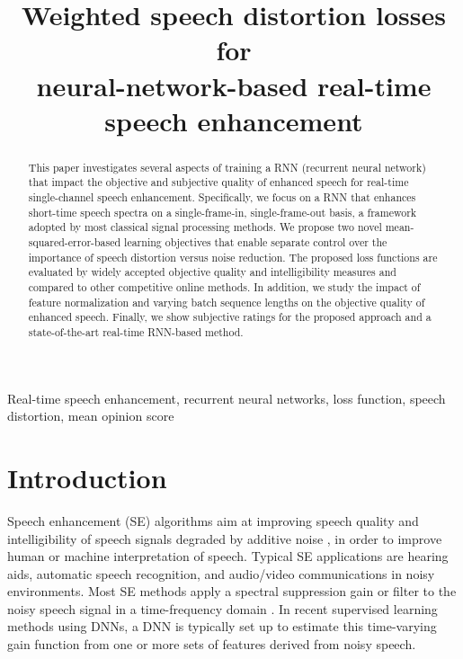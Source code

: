 \documentclass{article}
\title{Weighted speech distortion losses for \\neural-network-based real-time speech enhancement}
\begin{document}
\ninept
\maketitle
\begin{abstract}
This paper investigates several aspects of training a RNN (recurrent neural network) that impact the objective and subjective quality of enhanced speech for real-time single-channel speech enhancement. Specifically, we focus on a RNN that enhances short-time speech spectra on a single-frame-in, single-frame-out basis, a framework adopted by most classical signal processing methods. We propose two novel mean-squared-error-based learning objectives that enable separate control over the importance of speech distortion versus noise reduction. The proposed loss functions are evaluated by widely accepted objective quality and intelligibility measures and compared to other competitive online methods. In addition, we study the impact of feature normalization and varying batch sequence lengths on the objective quality of enhanced speech. Finally, we show subjective ratings for the proposed approach and a state-of-the-art real-time RNN-based method.
\end{abstract}
\begin{keywords}
Real-time speech enhancement, recurrent neural networks, loss function, speech distortion, mean opinion score
\end{keywords}
\section{Introduction}
\label{sec:intro}
Speech enhancement (SE) algorithms aim at improving speech quality and intelligibility of speech signals degraded by additive noise \cite{loizou2013speech}, in order to improve human or machine interpretation of speech. Typical SE applications are hearing aids, automatic speech recognition, and audio/video communications in noisy environments. Most SE methods apply a spectral suppression gain or filter to the noisy speech signal in a time-frequency domain \cite{Benesty2005}. In recent supervised learning methods using \ac{DNNs}, a DNN is typically set up to estimate this time-varying gain function \cite{wang2014training} from one or more sets of features derived from noisy speech.
\end{document}
